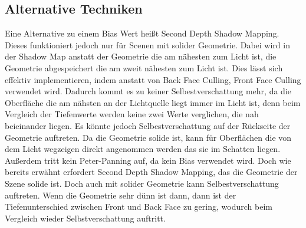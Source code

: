 \subsection{Alternative Techniken}
\label{section:sdsm}
Eine Alternative zu einem Bias Wert heißt Second Depth Shadow Mapping.
Dieses funktioniert jedoch nur für Scenen mit solider Geometrie.
Dabei wird in der Shadow Map anstatt der Geometrie die am nähesten zum 
Licht ist, die Geometrie abgespeichert die am zweit nähesten zum Licht ist.
Dies lässt sich effektiv implementieren, indem anstatt von Back Face Culling, Front Face Culling verwendet wird.
Dadurch kommt es zu keiner Selbestverschattung mehr, da die Oberfläche die am nähsten an der 
Lichtquelle liegt immer im Licht ist, denn beim Vergleich der Tiefenwerte werden
keine zwei Werte verglichen, die nah beieinander liegen.
Es könnte jedoch Selbestverschattung auf der Rückseite der Geometrie auftreten.
Da die Geometrie solide ist, kann für Oberflächen die von dem Licht wegzeigen direkt 
angenommen werden das sie im Schatten liegen.
Außerdem tritt kein Peter-Panning auf, da kein Bias verwendet wird.
Doch wie bereits erwähnt erfordert Second Depth Shadow Mapping, das die
Geometrie der Szene solide ist.
Doch auch mit solider Geometrie kann Selbestverschattung auftreten.
Wenn die Geometrie sehr dünn ist dann, dann ist der Tiefenunterschied zwischen Front und Back Face zu gering, 
wodurch beim Vergleich wieder Selbstverschattung auftritt.

